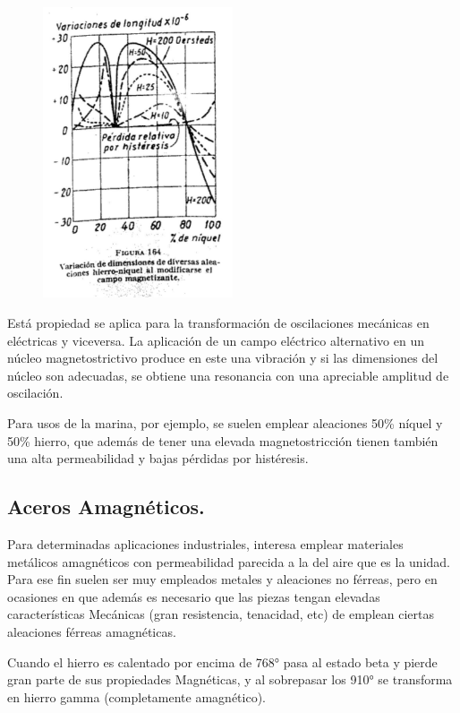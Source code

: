 \documentclass[12pt,a4paper]{article}
\begin{document}
\begin{figure}[t]    
    \centering         
    \includegraphics[width=0.5\textwidth]{IMAGENES LATEX/10.jpg}
\end{figure}

Está propiedad se aplica para la transformación de oscilaciones mecánicas en eléctricas y viceversa. La aplicación de un campo eléctrico alternativo en un núcleo magnetostrictivo produce en este una vibración y si las dimensiones del núcleo son adecuadas, se obtiene una resonancia con una apreciable amplitud de oscilación.

Para usos de la marina, por ejemplo, se suelen emplear aleaciones 50\% níquel y 50\% hierro, que además de tener una elevada magnetostricción tienen también una alta permeabilidad y bajas pérdidas por histéresis.

\subsection{Aceros Amagnéticos.}

Para determinadas aplicaciones industriales, interesa emplear materiales metálicos amagnéticos con permeabilidad parecida a la del aire que es la unidad. Para ese fin suelen ser muy empleados metales y aleaciones no férreas, pero en ocasiones en que además es necesario que las piezas tengan elevadas características Mecánicas (gran resistencia, tenacidad, etc) de emplean ciertas aleaciones férreas amagnéticas.

Cuando el hierro es calentado por encima de 768° pasa al estado beta y pierde gran parte de sus propiedades Magnéticas, y al sobrepasar los 910° se transforma en hierro gamma (completamente amagnético).
\end{document}
